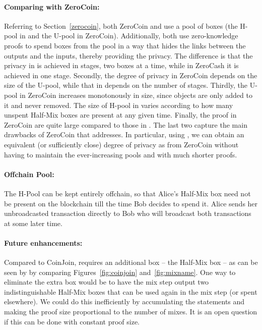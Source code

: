 \documentclass[11pt]{article}
\newcommand{\mixname}{ErgoMix\xspace}
\begin{document}
\paragraph{Comparing with ZeroCoin:} Referring to Section~\ref{zerocoin}, both ZeroCoin and \algname use a pool of boxes (the H-pool in \algname and the U-pool in ZeroCoin). Additionally, both use zero-knowledge proofs to spend boxes from the pool in a way that hides the links between the outputs and the inputs, thereby providing the privacy. 
The difference is that the privacy in \algname is achieved in stages, two boxes at a time, while in ZeroCash it is achieved in one stage. Secondly, the degree of privacy in ZeroCoin depends on the size of the U-pool, while that in \algname depends on the number of stages. Thirdly, the U-pool in ZeroCoin increases monotonously in size, since objects are only added to it and never removed. The size of H-pool in \algname varies according to how many unspent Half-Mix boxes are present at any given time. Finally, the proof in ZeroCoin are quite large compared to those in \algname. The last two capture the main drawbacks of ZeroCoin that \algname addresses. 
In particular, using \algname, we can obtain an equivalent (or sufficiently close) degree of privacy as from ZeroCoin without having to maintain the ever-increasing pools and with much shorter proofs. 

\paragraph{Offchain Pool:} The H-Pool can be kept entirely offchain, so that Alice's Half-Mix box need not be present on the blockchain till the time Bob decides to spend it. Alice sends her unbroadcasted transaction directly to Bob who will broadcast both transactions at some later time. 


\paragraph{Future enhancements:} Compared to CoinJoin, \algname requires an additional box -- the Half-Mix box -- as can be seen by by comparing Figures~\ref{fig:coinjoin} and~\ref{fig:mixname}. One way to eliminate the extra box would be to have the mix step output two indistinguishable Half-Mix boxes that can be used again in the mix step (or spent elsewhere). We could do this inefficiently by accumulating the statements and making the proof size proportional to the number of mixes. It is an open question if this can be done with constant proof size.
\end{document}
